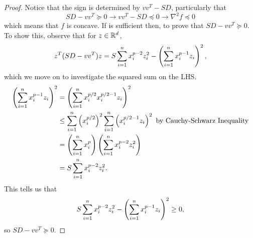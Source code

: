 \documentclass{exam}
\begin{document}
\begin{questions}
\begin{parts}
\begin{proof}
            Notice that the sign is determined by $vv^T - SD$, particularly that 
            $$SD - vv^T \succeq 0 \longrightarrow vv^T - SD \preceq 0 \longrightarrow \nabla^2 f \preceq 0$$
            which means that $f$ is concave. If is sufficient then, to prove that $SD - vv^T \succeq 0$. To show this, observe that
            for $z\in\mathbb {R}^d$,
            $$z^T(SD - vv^T)z = S\sum_{i = 1}^n x_i^{p - 2}z_i^2 - \left( \sum_{i = 1}^n x_i^{p - 1}z_i \right)^2,$$
            which we move on to investigate the squared sum on the LHS.
            \begin{align*}
                \left( \sum_{i = 1}^n x_i^{p - 1}z_i \right)^2 &= \left( \sum_{i = 1}^n x_i^{p / 2}x_i^{p/2 - 1}z_i \right)^2 \\
                &\leq \sum_{i = 1}^n \left( x_i^{p / 2} \right)^2\sum_{i = 1}^n \left( x_i^{p/2 - 1}z_i \right)^2 \text{ by Cauchy-Schwarz Inequality} \\
                &= \left( \sum_{i = 1}^n x_i^p \right)\left( \sum_{i = 1}^n x_i^{p - 2}z_i^2 \right) \\
                &= S\sum_{i = 1}^n x_i^{p - 2}z_i^2.
            \end{align*}
            This tells us that
            $$S\sum_{i = 1}^n x_i^{p - 2}z_i^2 - \left( \sum_{i = 1}^n x_i^{p - 1}z_i \right)^2 \geq 0,$$
            so $SD - vv^T \succeq 0$.
        \end{proof}



\end{parts}
\end{questions}
\end{document}
